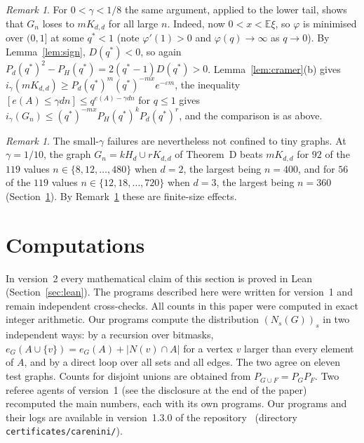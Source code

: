 \documentclass[11pt]{article}
\theoremstyle{remark}
\newtheorem{remark}[theorem]{Remark}
\newcommand{\Ex}{\mathbb E}
\begin{document}
\begin{remark}\label{rem:lower}
For $0<\gamma<1/8$ the same argument, applied to the lower tail, shows that
$G_n$ loses to $mK_{d,d}$ for all large $n$. Indeed, now $0<x<\Ex\xi$, so
$\varphi$ is minimised over $(0,1]$ at some $q^*<1$ (note $\varphi'(1)>0$ and
$\varphi(q)\to\infty$ as $q\to0$). By Lemma~\ref{lem:sign},
$D(q^*)<0$, so again $P_d(q^*)^2-P_H(q^*)=2(q^*-1)D(q^*)>0$.
Lemma~\ref{lem:cramer}(b) gives
$i_\gamma(mK_{d,d})\ge P_d(q^*)^m(q^*)^{-mx}e^{-\varepsilon m}$, the inequality
$[e(A)\le\gamma dn]\le q^{e(A)-\gamma dn}$ for $q\le1$ gives
$i_\gamma(G_n)\le(q^*)^{-mx}P_H(q^*)^kP_d(q^*)^r$, and the comparison is as
above.
\end{remark}

\begin{remark}\label{rem:tenth}
The small-$\gamma$ failures are nevertheless not confined to tiny graphs. At
$\gamma=1/10$, the graph $G_n=kH_d\cup rK_{d,d}$ of Theorem~D beats
$mK_{d,d}$ for $92$ of the $119$ values $n\in\{8,12,\dots,480\}$ when $d=2$,
the largest being $n=400$, and for $56$ of the $119$ values
$n\in\{12,18,\dots,720\}$ when $d=3$, the largest being $n=360$
(Section~\ref{sec:comp}). By Remark~\ref{rem:lower} these are finite-size
effects.
\end{remark}

\section{Computations}\label{sec:comp}
In version~2 every mathematical claim of this section is proved in Lean
(Section~\ref{sec:lean}). The programs described here were written for
version~1 and remain independent cross-checks. All counts in this paper were
computed in exact integer arithmetic. Our
programs compute the distribution $(N_s(G))_s$ in two independent ways: by a
recursion over bitmasks, $e_G(A\cup\{v\})=e_G(A)+|N(v)\cap A|$ for a vertex
$v$ larger than every element of $A$, and by a direct loop over all sets and
all edges. The two agree on eleven test graphs. Counts for disjoint unions are
obtained from $P_{G\cup F}=P_GP_F$. Two referee agents of version~1 (see the
disclosure at the end of the paper) recomputed the main numbers, each with its own programs.
Our programs and their logs are available in version~1.3.0 of the
repository~\cite{repo} (directory \texttt{certificates/carenini/}).
\end{document}
